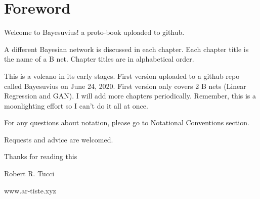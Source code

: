 \chapter*{Foreword}

Welcome to Bayesuvius! a proto-book uploaded to github.

A different Bayesian network is discussed
 in each chapter. Each chapter title is 
the name of a B net. Chapter titles are
 in alphabetical order.

This is a volcano in its early stages.
 First version uploaded to a github repo 
called Bayesuvius on June 24, 2020. 
First version only covers 2 B nets 
(Linear Regression and GAN). 
I will add more chapters periodically.
 Remember, this is a moonlighting effort 
so I can't do it all at once.

For any questions about notation, 
please go to Notational Conventions section.

Requests and advice are welcomed.


\bigskip
\noindent Thanks for reading this

\noindent Robert R. Tucci

\noindent www.ar-tiste.xyz

